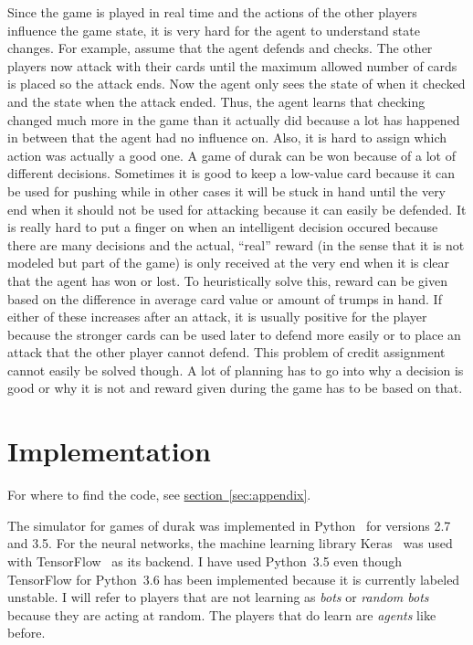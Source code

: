 \documentclass[a4paper,titlepage]{article}
\begin{document}
Since the game is played in real time and the actions of the other players influence the game state, it is very hard for the agent to understand state changes. For example, assume that the agent defends and checks. The other players now attack with their cards until the maximum allowed number of cards is placed so the attack ends. Now the agent only sees the state of when it checked and the state when the attack ended. Thus, the agent learns that checking changed much more in the game than it actually did because a lot has happened in between that the agent had no influence on. Also, it is hard to assign which action was actually a good one. A game of durak can be won because of a lot of different decisions. Sometimes it is good to keep a low-value card because it can be used for pushing while in other cases it will be stuck in hand until the very end when it should not be used for attacking because it can easily be defended. It is really hard to put a finger on when an intelligent decision occured because there are many decisions and the actual, ``real'' reward (in the sense that it is not modeled but part of the game) is only received at the very end when it is clear that the agent has won or lost. To heuristically solve this, reward can be given based on the difference in average card value or amount of trumps in hand. If either of these increases after an attack, it is usually positive for the player because the stronger cards can be used later to defend more easily or to place an attack that the other player cannot defend. This problem of credit assignment cannot easily be solved though. A lot of planning has to go into why a decision is good or why it is not and reward given during the game has to be based on that.

\newpage

\section{Implementation}

For where to find the code, see \hyperref[sec:appendix]{section~\ref*{sec:appendix}}.

The simulator for games of durak was implemented in Python~\cite{python} for versions 2.7 and 3.5. For the neural networks, the machine learning library Keras~\cite{keras} was used with {TensorFlow}~\cite{tensorflow}  as its backend. I have used Python~3.5 even though TensorFlow for Python~3.6 has been implemented because it is currently labeled unstable. I will refer to players that are not learning as \emph{bots} or \emph{random bots} because they are acting at random. The players that do learn are \emph{agents} like before.
\end{document}
